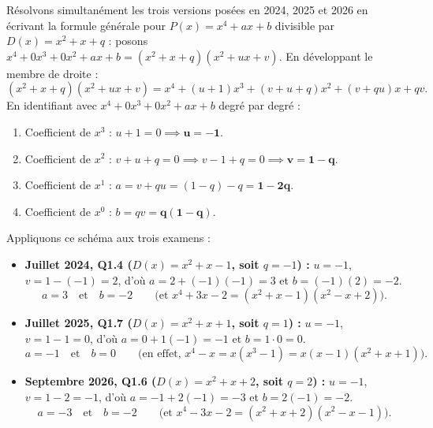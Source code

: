 \begin{exemple}
Résolvons simultanément les trois versions posées en 2024, 2025 et 2026 en écrivant la formule générale pour $P(x) = x^4 + ax + b$ divisible par $D(x) = x^2 + x + q$ :
posons $x^4 + 0x^3 + 0x^2 + ax + b = (x^2 + x + q)(x^2 + ux + v)$.
En développant le membre de droite :
\[
    (x^2 + x + q)(x^2 + ux + v) = x^4 + (u + 1)x^3 + (v + u + q)x^2 + (v + qu)x + qv.
\]
En identifiant avec $x^4 + 0x^3 + 0x^2 + ax + b$ degré par degré :
\begin{enumerate}
    \item Coefficient de $x^3$ : $u + 1 = 0 \implies \mathbf{u = -1}$.
    \item Coefficient de $x^2$ : $v + u + q = 0 \implies v - 1 + q = 0 \implies \mathbf{v = 1 - q}$.
    \item Coefficient de $x^1$ : $a = v + qu = (1 - q) - q = \mathbf{1 - 2q}$.
    \item Coefficient de $x^0$ : $b = qv = \mathbf{q(1 - q)}$.
\end{enumerate}
Appliquons ce schéma aux trois examens :
\begin{itemize}
    \item \textbf{Juillet 2024, Q1.4 ($D(x) = x^2 + x - 1$, soit $q = -1$) :}
    $u = -1$, $v = 1 - (-1) = 2$, d'où $a = 2 + (-1)(-1) = 3$ et $b = (-1)(2) = -2$.
    \[
        \boxed{a = 3 \quad \text{et} \quad b = -2} \qquad \bigl(\text{et } x^4 + 3x - 2 = (x^2 + x - 1)(x^2 - x + 2)\bigr).
    \]
    \item \textbf{Juillet 2025, Q1.7 ($D(x) = x^2 + x + 1$, soit $q = 1$) :}
    $u = -1$, $v = 1 - 1 = 0$, d'où $a = 0 + 1(-1) = -1$ et $b = 1 \cdot 0 = 0$.
    \[
        \boxed{a = -1 \quad \text{et} \quad b = 0} \qquad \bigl(\text{en effet, } x^4 - x = x(x^3 - 1) = x(x - 1)(x^2 + x + 1)\bigr).
    \]
    \item \textbf{Septembre 2026, Q1.6 ($D(x) = x^2 + x + 2$, soit $q = 2$) :}
    $u = -1$, $v = 1 - 2 = -1$, d'où $a = -1 + 2(-1) = -3$ et $b = 2(-1) = -2$.
    \[
        \boxed{a = -3 \quad \text{et} \quad b = -2} \qquad \bigl(\text{et } x^4 - 3x - 2 = (x^2 + x + 2)(x^2 - x - 1)\bigr).
    \]
\end{itemize}
\end{exemple}

